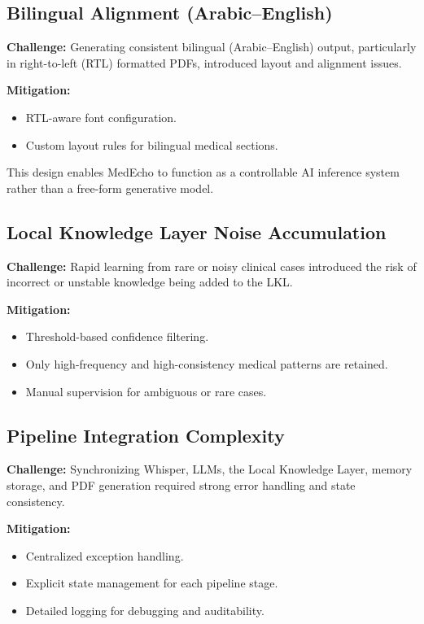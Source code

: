 \subsection*{Bilingual Alignment (Arabic–English)}

\textbf{Challenge:}  
Generating consistent bilingual (Arabic–English) output, particularly in right-to-left (RTL) formatted PDFs, introduced layout and alignment issues.

\textbf{Mitigation:}
\begin{itemize}
    \item RTL-aware font configuration.
    \item Custom layout rules for bilingual medical sections.
\end{itemize}
This design enables MedEcho to function as a controllable AI inference system rather than a free-form generative model.

\subsection*{Local Knowledge Layer Noise Accumulation}

\textbf{Challenge:}  
Rapid learning from rare or noisy clinical cases introduced the risk of incorrect or unstable knowledge being added to the LKL.

\textbf{Mitigation:}
\begin{itemize}
    \item Threshold-based confidence filtering.
    \item Only high-frequency and high-consistency medical patterns are retained.
    \item Manual supervision for ambiguous or rare cases.
\end{itemize}

\subsection*{Pipeline Integration Complexity}

\textbf{Challenge:}  
Synchronizing Whisper, LLMs, the Local Knowledge Layer, memory storage, and PDF generation required strong error handling and state consistency.

\textbf{Mitigation:}
\begin{itemize}
    \item Centralized exception handling.
    \item Explicit state management for each pipeline stage.
    \item Detailed logging for debugging and auditability.
\end{itemize}


